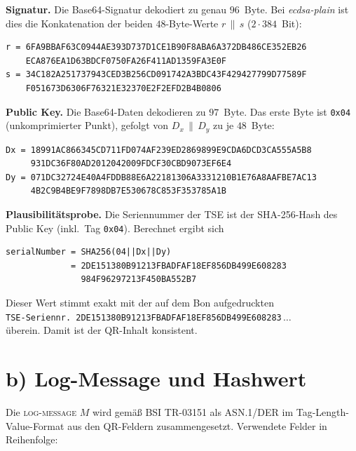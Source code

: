 \documentclass[
    fontsize=12pt,          %
    paper=a4,               %
    numbers=noenddot,       %
    listof=totoc,           %
    listof=entryprefix,     %
    listof=nochaptergap,    %
    bibliography=totoc,     %
    parskip=half,           %
    openany                 %
]{scrbook}
\begin{document}
\textbf{Signatur.} Die Base64-Signatur dekodiert zu genau $96$~Byte. Bei
\emph{ecdsa-plain} ist dies die Konkatenation der beiden $48$-Byte-Werte $r \,\|\, s$ ($2\cdot 384$~Bit):

\begin{lstlisting}[caption={Dekodiertes Signaturpaar $(r,s)$ (hex)}]
r = 6FA9BBAF63C0944AE393D737D1CE1B90F8ABA6A372DB486CE352EB26
    ECA876EA1D63BDCF0750FA26F411AD1359FA3E0F
s = 34C182A251737943CED3B256CD091742A3BDC43F429427799D77589F
    F051673D6306F76321E32370E2F2EFD2B4B0806
\end{lstlisting}

\textbf{Public Key.} Die Base64-Daten dekodieren zu $97$~Byte. Das erste Byte ist
\texttt{0x04} (unkomprimierter Punkt), gefolgt von $D_x \,\|\, D_y$ zu je $48$~Byte:

\begin{lstlisting}[caption={Dekodierter Public Key $D=(D_x,D_y)$ (hex)}]
Dx = 18991AC866345CD711FD074AF239ED2869899E9CDA6DCD3CA555A5B8
     931DC36F80AD2012042009FDCF30CBD9073EF6E4
Dy = 071DC32724E40A4FDDB88E6A22181306A3331210B1E76A8AAFBE7AC13
     4B2C9B4BE9F7898DB7E530678C853F353785A1B
\end{lstlisting}

\textbf{Plausibilitätsprobe.} Die Seriennummer der TSE ist der SHA-256-Hash des Public Key
(inkl.\ Tag \texttt{0x04}). Berechnet ergibt sich

\begin{lstlisting}
serialNumber = SHA256(04||Dx||Dy)
             = 2DE151380B91213FBADFAF18EF856DB499E608283
               984F96297213F450BA552B7
\end{lstlisting}

\noindent Dieser Wert stimmt exakt mit der auf dem Bon aufgedruckten\\
\texttt{TSE-Seriennr.\ 2DE151380B91213FBADFAF18EF856DB499E608283}\,$\dots$\\
überein. Damit ist der QR-Inhalt konsistent.


\section*{b) Log-Message und Hashwert}

Die \textsc{log-message} $M$ wird gemäß BSI TR-03151 als ASN.1/DER im Tag-Length-Value-Format
aus den QR-Feldern zusammengesetzt. Verwendete Felder in Reihenfolge:
\end{document}
